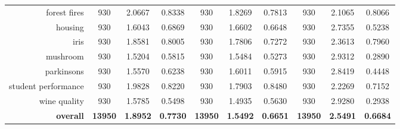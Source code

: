 \begin{table}[H]
{\begin{tabular}{rccccccccc}
			forest fires                        & 930                                         & 2.0667                                                                    & 0.8338          & 930            & \cellcolor[rgb]{ .776,  .937,  .808}\textcolor[rgb]{ 0,  .38,  0}{1.8269}          & 0.7813          & 930            & 2.1065          & 0.8066          \\
			housing                             & 930                                         & \cellcolor[rgb]{ .776,  .937,  .808}\textcolor[rgb]{ 0,  .38,  0}{1.6043} & 0.6869          & 930            & 1.6602                                                                             & 0.6648          & 930            & 2.7355          & 0.5238          \\
			iris                                & 930                                         & 1.8581                                                                    & 0.8005          & 930            & \cellcolor[rgb]{ .776,  .937,  .808}\textcolor[rgb]{ 0,  .38,  0}{1.7806}          & 0.7272          & 930            & 2.3613          & 0.7960          \\
			mushroom                            & 930                                         & \cellcolor[rgb]{ .776,  .937,  .808}\textcolor[rgb]{ 0,  .38,  0}{1.5204} & 0.5815          & 930            & 1.5484                                                                             & 0.5273          & 930            & 2.9312          & 0.2890          \\
			parkinsons                          & 930                                         & \cellcolor[rgb]{ .776,  .937,  .808}\textcolor[rgb]{ 0,  .38,  0}{1.5570} & 0.6238          & 930            & 1.6011                                                                             & 0.5915          & 930            & 2.8419          & 0.4448          \\
			student performance                 & 930                                         & 1.9828                                                                    & 0.8220          & 930            & \cellcolor[rgb]{ .776,  .937,  .808}\textcolor[rgb]{ 0,  .38,  0}{1.7903}          & 0.8480          & 930            & 2.2269          & 0.7152          \\
			wine quality                        & 930                                         & 1.5785                                                                    & 0.5498          & 930            & \cellcolor[rgb]{ .776,  .937,  .808}\textcolor[rgb]{ 0,  .38,  0}{1.4935}          & 0.5630          & 930            & 2.9280          & 0.2938          \\
			\midrule
			\textbf{overall}                    & \textbf{13950}                              & \textbf{1.8952}                                                           & \textbf{0.7730} & \textbf{13950} & \cellcolor[rgb]{ .776,  .937,  .808}\textcolor[rgb]{ 0,  .38,  0}{\textbf{1.5492}} & \textbf{0.6651} & \textbf{13950} & \textbf{2.5491} & \textbf{0.6684} \\
		\end{tabular}%
	}
\end{table}%

